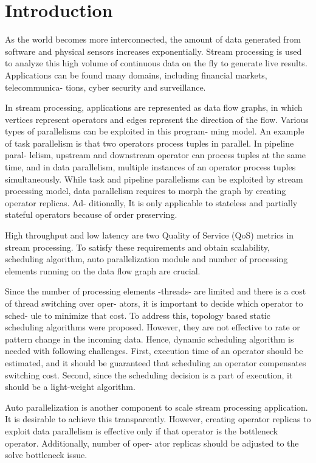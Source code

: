 \section{Introduction}\label{sec:introduction}

As the world becomes more interconnected, the amount of data generated from
software and physical sensors increases exponentially. Stream processing is
used to analyze this high volume of continuous data on the fly to generate
live results. Applications can be found many domains, including financial
markets, telecommunica- tions, cyber security and surveillance.

In stream processing, applications are represented as data flow graphs, in
which vertices represent operators and edges represent the direction of the
flow. Various types of parallelisms can be exploited in this program- ming
model. An example of task parallelism is that two operators process tuples in
parallel. In pipeline paral- lelism, upstream and downstream operator can
process tuples at the same time, and in data parallelism, multiple instances
of an operator process tuples simultaneously. While task and pipeline
parallelisms can be exploited by stream processing model, data parallelism
requires to morph the graph by creating operator replicas. Ad- ditionally, It
is only applicable to stateless and partially stateful operators because of
order preserving.

High throughput and low latency are two Quality of Service (QoS) metrics in
stream processing. To satisfy these requirements and obtain scalability,
scheduling algorithm, auto parallelization module and number of processing
elements running on the data flow graph are crucial.

Since the number of processing elements -threads- are limited and there is a
cost of thread switching over oper- ators, it is important to decide which
operator to sched- ule to minimize that cost. To address this, topology based
static scheduling algorithms were proposed. However, they are not effective to
rate or pattern change in the incoming data. Hence, dynamic scheduling
algorithm is needed with following challenges. First, execution time of an
operator should be estimated, and it should be guaranteed that scheduling an
operator compensates switching cost. Second, since the scheduling decision is
a part of execution, it should be a light-weight algorithm.

Auto parallelization is another component to scale stream processing
application. It is desirable to achieve this transparently. However, creating
operator replicas to exploit data parallelism is effective only if that
operator is the bottleneck operator. Additionally, number of oper- ator
replicas should be adjusted to the solve bottleneck issue.

